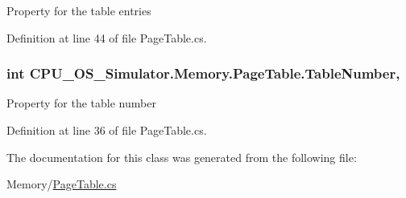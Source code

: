 Property for the table entries 



Definition at line 44 of file Page\+Table.\+cs.

\hypertarget{class_c_p_u___o_s___simulator_1_1_memory_1_1_page_table_a7a30b834bfe4da78dcaa6276b4572c93}{}
\subsubsection[{Table\+Number}]{\setlength{\rightskip}{0pt plus 5cm}int C\+P\+U\+\_\+\+O\+S\+\_\+\+Simulator.\+Memory.\+Page\+Table.\+Table\+Number\hspace{0.3cm}{\ttfamily [get]}, {\ttfamily [set]}}\label{class_c_p_u___o_s___simulator_1_1_memory_1_1_page_table_a7a30b834bfe4da78dcaa6276b4572c93}


Property for the table number 



Definition at line 36 of file Page\+Table.\+cs.



The documentation for this class was generated from the following file\+:\begin{DoxyCompactItemize}
\item 
Memory/\hyperlink{_page_table_8cs}{Page\+Table.\+cs}\end{DoxyCompactItemize}
